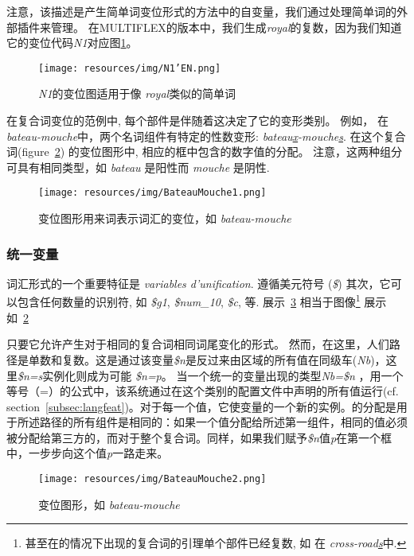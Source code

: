 \bigskip
\noindent 注意，该描述是产生简单词变位形式的方法中的自变量，我们通过处理简单词的外部插件来管理。
在MULTIFLEX的版本中，我们生成\emph{royal}的复数，因为我们知道它的变位代码\emph{N1}对应图\ref{fig:N1}。

\begin{figure}[!htb]
  \centering
  \texttt{[image: resources/img/N1'EN.png]}
  \caption{ \emph{N1}的变位图适用于像 \emph{royal}类似的简单词}
  \label{fig:N1}
\end{figure}

\bigskip 在复合词变位的范例中, 每个部件是伴随着这决定了它的变形类别。
例如， 在 \emph{bateau-mouche}中，两个名词组件有特定的性数变形: \emph{bateau\underline{x}-mouche\underline{s}}. 
在这个复合词(figure~\ref{fig:BateauMouche1}) 的变位图形中, 相应的框中包含的数字值的分配。
注意，这两种组分可具有相同类型，如 \emph{bateau} 是阳性而
\emph{mouche} 是阴性.

\begin{figure}[!htb]
  \centering
  \texttt{[image: resources/img/BateauMouche1.png]}
  \caption{变位图形用来词表示词汇的变位，如 \emph{bateau-mouche}}
  \label{fig:BateauMouche1}
\end{figure}

\subsubsection{统一变量}
词汇形式的一个重要特征是 \textit{variables d'unification}.
遵循美元符号 (\emph{\$}) 其次，它可以包含任何数量的识别符, 如 \emph{\$g1}, \emph{\$num\_10}, \emph{\$c}, 等.
展示~\ref{fig:BateauMouche2} 相当于图像\footnote {甚至在的情况下出现的复合词的引理单个部件已经复数, 如 在 \emph{cross-road\underline{s}}中.} 展示如~\ref{fig:BateauMouche1}

只要它允许产生对于相同的复合词相同词尾变化的形式。
然而，在这里，人们路径是单数和复数。这是通过该变量\emph{\$n}是反过来由区域的所有值在同级车(\emph{Nb})，这里\emph{\$n=s}实例化则成为可能 \emph{\$n=p}。
当一个统一的变量出现的类型\emph{Nb=\$n} ，用一个等号（=）的公式中，该系统通过在这个类别的配置文件中声明的所有值运行(cf. section~\ref{subsec:langfeat})。对于每一个值，它使变量的一个新的实例。的分配是用于所述路径的所有组件是相同的：如果一个值分配给所述第一组件，相同的值必须被分配给第三方的，而对于整个复合词。同样，如果我们赋予\emph{\$n}值\emph{p}在第一个框中，一步步向这个值\emph{p}一路走来。

\begin{figure}[!htb]
  \centering
  \texttt{[image: resources/img/BateauMouche2.png]}
  \caption{变位图形，如 \emph{bateau-mouche}}
  \label{fig:BateauMouche2}
\end{figure}

